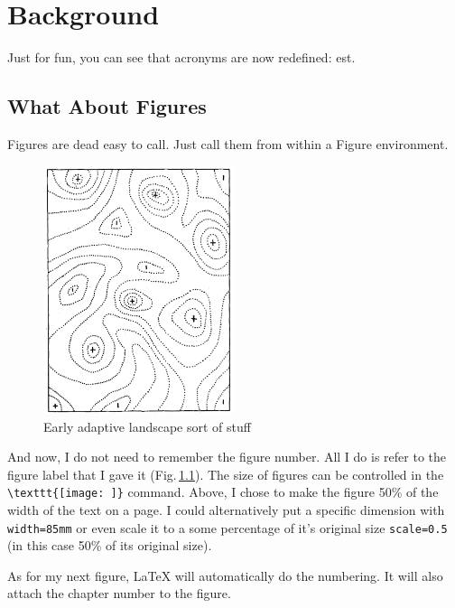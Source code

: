 \chapter{Background} 
\label{background} 

Just for fun, you can see that acronyms are now redefined: \ac{est}.

\section{What About Figures}

Figures are dead easy to call. Just call them from within a Figure environment.

\begin{figure}[ht] %
	\centering
	\includegraphics[width=0.5\textwidth]{Figs/Wright_1932_1.pdf}
    \caption[Adaptive landscape]{Early adaptive landscape sort of stuff}
    \label{landscape}
\end{figure}

And now, I do not need to remember the figure number. All I do is refer to the figure label that I gave it (Fig.\,\ref{landscape}). The size of figures can be controlled in the \verb+\texttt{[image: ]}+ command. Above, I chose to make the figure 50\% of the width of the text on a page. I could alternatively put a specific dimension with \verb+width=85mm+ or even scale it to a some percentage of it's original size \verb+scale=0.5+ (in this case 50\% of its original size).  

As for my next figure, \LaTeX{} will automatically do the numbering. It will also attach the chapter number to the figure.



